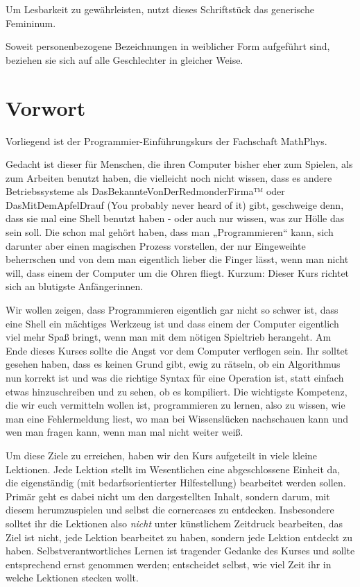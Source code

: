 \documentclass{vorkurs}
\begin{document}
Um Lesbarkeit zu gewährleisten, nutzt dieses Schriftstück das generische
Femininum.

Soweit personenbezogene Bezeichnungen in weiblicher Form aufgeführt sind,
beziehen sie sich auf alle Geschlechter in gleicher Weise.

\clearpage

\chapter{Vorwort}
\pagestyle{empty}

Vorliegend ist der Programmier-Einführungskurs der Fachschaft MathPhys.

Gedacht ist dieser für Menschen, die ihren Computer bisher eher zum Spielen,
als zum Arbeiten benutzt haben, die vielleicht noch nicht wissen, dass es
andere Betriebssysteme als DasBekannteVonDerRedmonderFirma™ oder
DasMitDemApfelDrauf (You probably never heard of it) gibt, geschweige denn,
dass sie mal eine Shell benutzt haben - oder auch nur wissen, was zur Hölle das
sein soll.  Die schon mal gehört haben, dass man „Programmieren“ kann, sich
darunter aber einen magischen Prozess vorstellen, der nur Eingeweihte
beherrschen und von dem man eigentlich lieber die Finger lässt, wenn man nicht
will, dass einem der Computer um die Ohren fliegt.  Kurzum: Dieser Kurs richtet
sich an blutigste Anfängerinnen.

Wir wollen zeigen, dass Programmieren eigentlich gar nicht so schwer ist, dass
eine Shell ein mächtiges Werkzeug ist und dass einem der Computer eigentlich
viel mehr Spaß bringt, wenn man mit dem nötigen Spieltrieb herangeht.  Am Ende
dieses Kurses sollte die Angst vor dem Computer verflogen sein. Ihr solltet
gesehen haben, dass es keinen Grund gibt, ewig zu rätseln, ob ein Algorithmus
nun korrekt ist und was die richtige Syntax für eine Operation ist, statt
einfach etwas hinzuschreiben und zu sehen, ob es kompiliert.  Die wichtigste
Kompetenz, die wir euch vermitteln wollen ist, programmieren zu lernen, also zu
wissen, wie man eine Fehlermeldung liest, wo man bei Wissenslücken nachschauen
kann und wen man fragen kann, wenn man mal nicht weiter weiß.

Um diese Ziele zu erreichen, haben wir den Kurs aufgeteilt in viele kleine
Lektionen. Jede Lektion stellt im Wesentlichen eine abgeschlossene Einheit da,
die eigenständig (mit bedarfsorientierter Hilfestellung) bearbeitet werden
sollen. Primär geht es dabei nicht um den dargestellten Inhalt, sondern darum,
mit diesem herumzuspielen und selbst die cornercases zu entdecken.
Insbesondere solltet ihr die Lektionen also \emph{nicht} unter künstlichem
Zeitdruck bearbeiten, das Ziel ist nicht, jede Lektion bearbeitet zu haben,
sondern jede Lektion entdeckt zu haben.  Selbstverantwortliches Lernen ist
tragender Gedanke des Kurses und sollte entsprechend ernst genommen werden;
entscheidet selbst, wie viel Zeit ihr in welche Lektionen stecken wollt.
\end{document}
